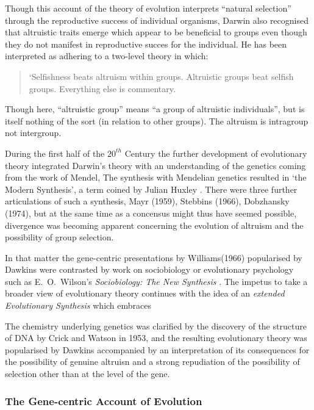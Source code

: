 \documentclass[10pt,titlepage]{article}
\begin{document}
Though this account of the theory of evolution interprets ``natural selection'' through the reproductive success of individual organisms, Darwin also recognised that altruistic traits emerge which appear to be beneficial to groups even though they do not manifest in reproductive succes for the individual.
He has been interpreted as adhering to a two-level theory in which:

\begin{quote}
`Selfishness beats altruism within groups.
Altruistic groups beat selfish groups.
Everything else is commentary.\cite{wilson2007rethinking}
\end{quote}

Though here, ``altruistic group'' means ``a group of altruistic individuals'', but is itself nothing of the sort (in relation to other groups).
The altruism is intragroup not intergroup.

During the first half of the $20^{th}$ Century the further development of evolutionary theory integrated Darwin's theory with an understanding of the genetics coming from the work of Mendel,
The synthesis with Mendelian genetics resulted in `the Modern Synthesis', a term coined by Julian Huxley \cite{huxley-tms}.
There were three further articulations of such a synthesis, Mayr (1959), Stebbins (1966), Dobzhansky (1974), but at the same time as a concensus might thus have seemed possible, divergence was becoming apparent concerning the evolution of altruism and the possibility of group selection.

In that matter the gene-centric presentations by Williams(1966) \cite{williams-ans} popularised by Dawkins \cite{dawkinsSG} were contrasted by work on sociobiology or evolutionary psychology such as E.~O.~Wilson's \emph{Sociobiology: The New Synthesis} \cite{wilson-stns}.
The impetus to take a broader view of evolutionary theory continues with the idea of an \emph{extended Evolutionary Synthesis} which embraces 

The chemistry underlying genetics was clarified by the discovery of the structure of DNA by Crick and Watson in 1953, and the resulting evolutionary theory was popularised by Dawkins accompanied by an interpretation of its consequences for the possibility of genuine altruisn \cite{dawkinsSG} and a strong repudiation of the possibility of selection other than at the level of the gene.

\subsubsection{The Gene-centric Account of Evolution}
\end{document}
